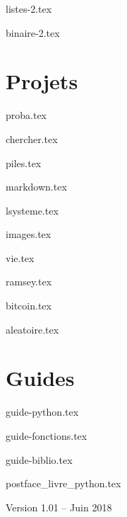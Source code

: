 \documentclass[11pt]{report}
\begin{document}
{listes-2.tex}

{binaire-2.tex}



\part{Projets}

{proba.tex}

{chercher.tex}

{piles.tex}

{markdown.tex}

{lsysteme.tex}

{images.tex}

{vie.tex}

{ramsey.tex}

{bitcoin.tex}

{aleatoire.tex}






\part{Guides}

{guide-python.tex}

{guide-fonctions.tex}

{guide-biblio.tex}



\clearemptydoublepage


{postface_livre_python.tex}

\vfill
\bigskip
\bigskip

\centerline{Version 1.01 -- Juin 2018}
\end{document}
